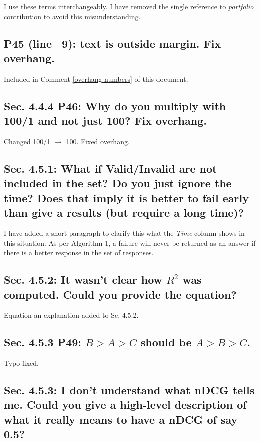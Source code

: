 \documentclass[]{article}
\begin{document}
I use these terms interchangeably. I have removed the single reference to \textit{portfolio} contribution to avoid this misunderstanding. 

\subsection{P45 (line –9): text is outside margin. Fix overhang.}

Included in Comment \ref{overhang-numbers} of this document.

\subsection{Sec. 4.4.4 P46: Why do you multiply with 100/1 and not just 100? Fix overhang.}

Changed 100/1 $\rightarrow$ 100. Fixed overhang.

\subsection{Sec. 4.5.1: What if Valid/Invalid are not included in the set? Do you just ignore the time? Does that imply it is better to fail early than give a results (but require a long time)?}

I have added a short paragraph to clarify this what the \textit{Time} column shows in this situation. 
As per Algorithm 1, a failure will never be returned as an answer if there is a better response in the set of responses. 

\subsection{Sec. 4.5.2: It wasn't clear how $R^{2}$ was computed. Could you provide the equation?}

Equation an explanation added to Se. 4.5.2.

\subsection{Sec. 4.5.3 P49: $B > A > C$ should be $A > B > C$.}

Typo fixed.

\subsection{Sec. 4.5.3: I don't understand what nDCG tells me. Could you give a high-level description of what it really means to have a nDCG of say 0.5?}
\end{document}
